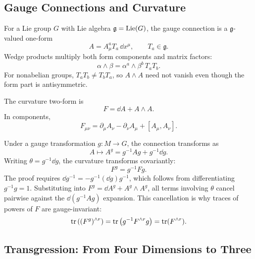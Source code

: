 \subsection{Gauge Connections and Curvature}
\label{subsec:lie-valued-forms}

For a Lie group $G$ with Lie algebra $\mathfrak g=\operatorname{Lie}(G)$, the gauge connection is a $\mathfrak g$-valued one-form
\begin{equation}
  A=A_\mu^a T_a\,\dd x^\mu,
  \qquad T_a\in\mathfrak g.
  \label{eq:forms-connection}
\end{equation}
Wedge products multiply both form components and matrix factors:
\begin{equation}
  \alpha\wedge\beta
  =
  \alpha^a\wedge\beta^b\,T_aT_b.
  \label{eq:forms-matrix-wedge}
\end{equation}
For nonabelian groups, $T_aT_b\neq T_bT_a$, so $A\wedge A$ need not vanish even though the form part is antisymmetric.

The curvature two-form is
\begin{equation}
  F=\dd A+A\wedge A.
  \label{eq:forms-curvature}
\end{equation}
In components,
\begin{equation}
  F_{\mu\nu}
  =
  \partial_\mu A_\nu-\partial_\nu A_\mu+[A_\mu,A_\nu].
  \label{eq:forms-curvature-components}
\end{equation}

Under a gauge transformation $g:M\to G$, the connection transforms as
\begin{equation}
  A\mapsto A^g=g^{-1}Ag+g^{-1}\dd g.
  \label{eq:forms-gauge-transformation}
\end{equation}
Writing $\theta=g^{-1}\dd g$, the curvature transforms covariantly:
\begin{equation}
  F^g=g^{-1}Fg.
  \label{eq:forms-curvature-covariant}
\end{equation}
The proof requires $\dd g^{-1}=-g^{-1}(\dd g)g^{-1}$, which follows from differentiating $g^{-1}g=1$. Substituting into $F^g=\dd A^g+A^g\wedge A^g$, all terms involving $\theta$ cancel pairwise against the $\dd(g^{-1}Ag)$ expansion. This cancellation is why traces of powers of $F$ are gauge-invariant:
\begin{equation}
  \operatorname{tr}\left((F^g)^{\wedge r}\right)
  =
  \operatorname{tr}\left(g^{-1}F^{\wedge r}g\right)
  =
  \operatorname{tr}(F^{\wedge r}).
  \label{eq:forms-gauge-invariant-polynomial}
\end{equation}

\subsection{Transgression: From Four Dimensions to Three}
\label{subsec:transgression-identity}

